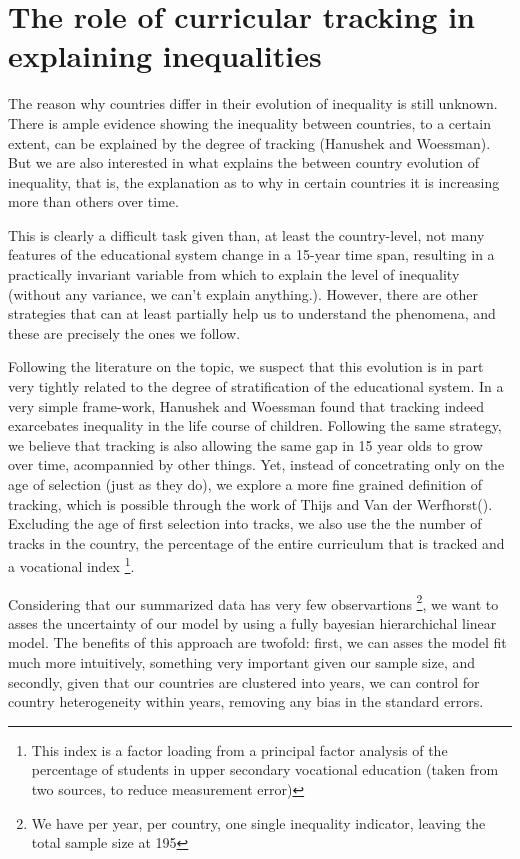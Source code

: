 \documentclass[11pt, a4paper]{article}\usepackage[]{graphicx}\usepackage[]{color}
\begin{document}
\section{The role of curricular tracking in explaining inequalities}











The reason why countries differ in their evolution of inequality is still unknown. There is ample evidence showing the inequality between countries, to a certain extent, can be explained by the degree of tracking (Hanushek and Woessman). But we are also interested in what explains the between country evolution of inequality, that is, the explanation as to why in certain countries it is increasing more than others over time.

This is clearly a difficult task given than, at least the country-level, not many features of the educational system change in a 15-year time span, resulting in a practically invariant variable from which to explain the level of inequality (without any variance, we can't explain anything.). However, there are other strategies that can at least partially help us to understand the phenomena, and these are precisely the ones we follow.

Following the literature on the topic, we suspect that this evolution is in part very tightly related to the degree of stratification of the educational system. In a very simple frame-work, Hanushek and Woessman found that tracking indeed exarcebates inequality in the life course of children. Following the same strategy, we believe that tracking is also allowing the same gap in 15 year olds to grow over time, acompannied by other things. Yet, instead of concetrating only on the age of selection (just as they do), we explore a more fine grained definition of tracking, which is possible through the work of Thijs and Van der Werfhorst(). Excluding the age of first selection into tracks, we also use the the number of tracks in the country, the percentage of the entire curriculum that is tracked and a vocational index \footnote{This index is a factor loading from a principal factor analysis of the percentage of students in upper secondary vocational education (taken from two sources, to reduce measurement error)}.

Considering that our summarized data has very few observartions \footnote{We have per year, per country, one single inequality indicator, leaving the total sample size at 195}, we want to asses the uncertainty of our model by using a fully bayesian hierarchichal linear model. The benefits of this approach are twofold: first, we can asses the model fit much more intuitively, something very important given our sample size, and secondly, given that our countries are clustered into years, we can control for country heterogeneity within years, removing any bias in the standard errors.
\end{document}

